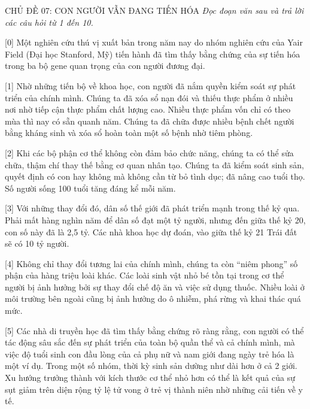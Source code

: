 \documentclass[12pt,a4paper,twoside]{article}
\newenvironment{readingpassage}[1][]{%
    \begin{tcolorbox}[enhanced, colback=grayLight, colframe=secondaryBlue,
        coltitle=textDark, fonttitle=\bfseries, title={#1},
        rounded corners, arc=3mm, boxrule=1pt,
        left=15pt, right=15pt, top=10pt, bottom=10pt,
        breakable, before skip=10pt, after skip=10pt, drop fuzzy shadow]
    \setstretch{1.3}
}{\end{tcolorbox}}
\begin{document}
\newpage
\label{a_cd07}
\begin{topicbox}{\large CHỦ ĐỀ 07: CON NGƯỜI VẪN ĐANG TIẾN HÓA}
\vspace{8pt}
\textit{Đọc đoạn văn sau và trả lời các câu hỏi từ 1 đến 10.}
\vspace{6pt}
\end{topicbox}
\vspace{5pt}
\begin{readingpassage}[]
[0] Một nghiên cứu thú vị xuất bản trong năm nay do nhóm nghiên cứu của Yair Field (Đại học Stanford, Mỹ) tiến hành đã tìm thấy bằng chứng của sự tiến hóa trong ba bộ gene quan trọng của con người đương đại.

[1] Nhờ những tiến bộ về khoa học, con người đã nắm quyền kiểm soát sự phát triển của chính mình. Chúng ta đã xóa sổ nạn đói và thiếu thực phẩm ở nhiều nơi nhờ tiếp cận thực phẩm chất lượng cao. Nhiều thực phẩm vốn chỉ có theo mùa thì nay có sẵn quanh năm. Chúng ta đã chữa được nhiều bệnh chết người bằng kháng sinh và xóa sổ hoàn toàn một số bệnh nhờ tiêm phòng.

[2] Khi các bộ phận cơ thể không còn đảm bảo chức năng, chúng ta có thể sửa chữa, thậm chí thay thế bằng cơ quan nhân tạo. Chúng ta đã kiểm soát sinh sản, quyết định có con hay không mà không cần từ bỏ tình dục; đã nâng cao tuổi thọ. Số người sống 100 tuổi tăng đáng kể mỗi năm.

[3] Với những thay đổi đó, dân số thế giới đã phát triển mạnh trong thế kỷ qua. Phải mất hàng nghìn năm để dân số đạt một tỷ người, nhưng đến giữa thế kỷ 20, con số này đã là 2,5 tỷ. Các nhà khoa học dự đoán, vào giữa thế kỷ 21 Trái đất sẽ có 10 tỷ người.

[4] Không chỉ thay đổi tương lai của chính mình, chúng ta còn ``niêm phong'' số phận của hàng triệu loài khác. Các loài sinh vật nhỏ bé tồn tại trong cơ thể người bị ảnh hưởng bởi sự thay đổi chế độ ăn và việc sử dụng thuốc. Nhiều loài ở môi trường bên ngoài cũng bị ảnh hưởng do ô nhiễm, phá rừng và khai thác quá mức.

[5] Các nhà di truyền học đã tìm thấy bằng chứng rõ ràng rằng, con người có thể tác động sâu sắc đến sự phát triển của toàn bộ quần thể và cả chính mình, mà việc độ tuổi sinh con đầu lòng của cả phụ nữ và nam giới đang ngày trẻ hóa là một ví dụ. Trong một số nhóm, thời kỳ sinh sản dường như dài hơn ở cả 2 giới. Xu hướng trưởng thành với kích thước cơ thể nhỏ hơn có thể là kết quả của sự sụt giảm trên diện rộng tỷ lệ tử vong ở trẻ vị thành niên nhờ những cải tiến về y tế.


\end{readingpassage}
\end{document}
